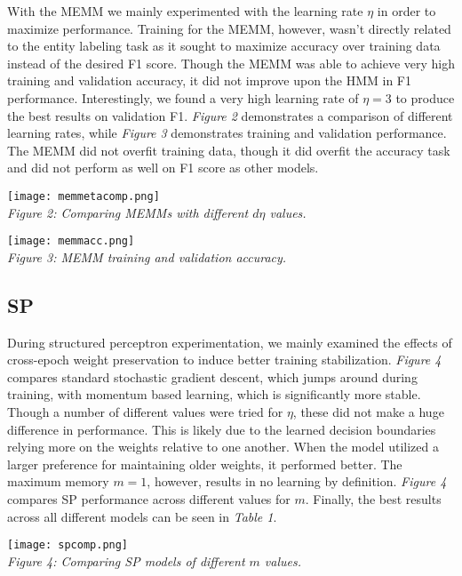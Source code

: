 \documentclass[11pt]{article}
\begin{document}
With the MEMM we mainly experimented with the learning rate $\eta$ in order to maximize performance. Training for the MEMM, however, wasn't directly related to the entity labeling task as it sought to maximize accuracy over training data instead of the desired F1 score. Though the MEMM was able to achieve very high training and validation accuracy, it did not improve upon the HMM in F1 performance. Interestingly, we found a very high learning rate of $\eta=3$ to produce the best results on validation F1. \textit{Figure 2} demonstrates a comparison of different learning rates, while \textit{Figure 3} demonstrates training and validation performance. The MEMM did not overfit training data, though it did overfit the accuracy task and did not perform as well on F1 score as other models.

\begin{center}
    \texttt{[image: memmetacomp.png]}\\
    \textit{Figure 2: Comparing MEMMs with different $d\eta$ values.}
\end{center}

\begin{center}
    \texttt{[image: memmacc.png]}\\
    \textit{Figure 3: MEMM training and validation accuracy.}
\end{center}

\subsection{SP}

During structured perceptron experimentation, we mainly examined the effects of cross-epoch weight preservation to induce better training stabilization. \textit{Figure 4} compares standard stochastic gradient descent, which jumps around during training, with momentum based learning, which is significantly more stable. Though a number of different values were tried for $\eta$, these did not make a huge difference in performance. This is likely due to the learned decision boundaries relying more on the weights relative to one another. When the model utilized a larger preference for maintaining older weights, it performed better. The maximum memory $m=1$, however, results in no learning by definition. \textit{Figure 4} compares SP performance across different values for $m$. Finally, the best results across all different models can be seen in \textit{Table 1}.

\begin{center}
    \texttt{[image: spcomp.png]}\\
    \textit{Figure 4: Comparing SP models of different $m$ values.}
\end{center}
\end{document}
